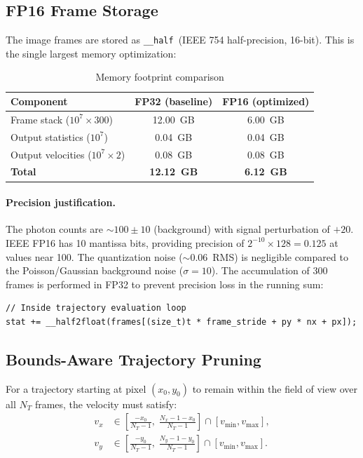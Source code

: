 \documentclass[11pt,letterpaper]{article}
\newcommand{\half}{\texttt{\_\_half}}
\begin{document}
\subsection{FP16 Frame Storage}
\label{sec:fp16}

The image frames are stored as \half\ (IEEE 754 half-precision, 16-bit).
This is the single largest memory optimization:

\begin{table}[h]
\centering
\caption{Memory footprint comparison}
\label{tab:memory}
\begin{tabular}{lcc}
\toprule
\textbf{Component} & \textbf{FP32 (baseline)} & \textbf{FP16 (optimized)} \\
\midrule
Frame stack ($10^7 \times 300$)    & 12.00~GB & 6.00~GB \\
Output statistics ($10^7$)         & 0.04~GB  & 0.04~GB \\
Output velocities ($10^7 \times 2$)& 0.08~GB  & 0.08~GB \\
\midrule
\textbf{Total}                     & \textbf{12.12~GB} & \textbf{6.12~GB} \\
\bottomrule
\end{tabular}
\end{table}

\paragraph{Precision justification.}
The photon counts are ${\sim}100 \pm 10$ (background) with signal
perturbation of $+20$. IEEE FP16 has 10 mantissa bits, providing
precision of $2^{-10} \times 128 = 0.125$ at values near 100.
The quantization noise (${\sim}0.06$~RMS) is negligible compared to
the Poisson/Gaussian background noise ($\sigma = 10$). The
accumulation of 300 frames is performed in FP32 to prevent precision
loss in the running sum:

\begin{lstlisting}[style=cuda, caption={FP16 read with FP32 accumulation}]
// Inside trajectory evaluation loop
stat += __half2float(frames[(size_t)t * frame_stride + py * nx + px]);
\end{lstlisting}

\subsection{Bounds-Aware Trajectory Pruning}
\label{sec:bounds_pruning}

For a trajectory starting at pixel $(x_0, y_0)$ to remain within the
field of view over all $N_T$ frames, the velocity must satisfy:
\begin{align}
    v_x &\in \left[\frac{-x_0}{N_T - 1},\;\frac{N_x - 1 - x_0}{N_T - 1}\right]
    \cap [v_{\min}, v_{\max}], \label{eq:vx_bounds} \\
    v_y &\in \left[\frac{-y_0}{N_T - 1},\;\frac{N_y - 1 - y_0}{N_T - 1}\right]
    \cap [v_{\min}, v_{\max}]. \label{eq:vy_bounds}
\end{align}
\end{document}
